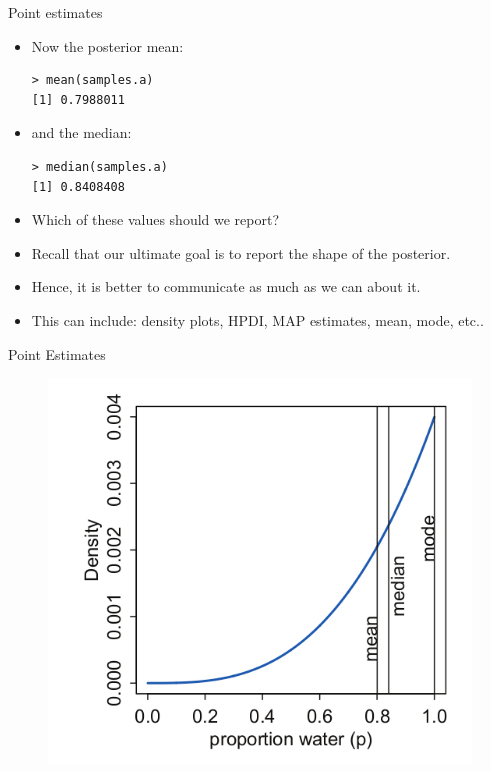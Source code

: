 \documentclass[handout]{beamer}
\begin{document}
\begin{frame}[fragile]{Point estimates}
\scriptsize{
\begin{itemize}

\item Now the posterior mean:

\begin{verbatim}
> mean(samples.a)
[1] 0.7988011
\end{verbatim}


\item and the median:

\begin{verbatim}
> median(samples.a)
[1] 0.8408408
\end{verbatim}


\item Which of these values should we report?

\item Recall that our ultimate goal is to report the shape of the posterior.

\item Hence, it is better to communicate as much as we can about it.  

\item This can include: density plots, HPDI, MAP estimates, mean, mode, etc..


\end{itemize}



} 

\end{frame}

\begin{frame}{Point Estimates}
\scriptsize{

   \begin{figure}[h!]
	\centering
	\includegraphics[scale=0.45]{pics/posterior_points.png}
	\end{figure} 




} 

\end{frame}
\end{document}
